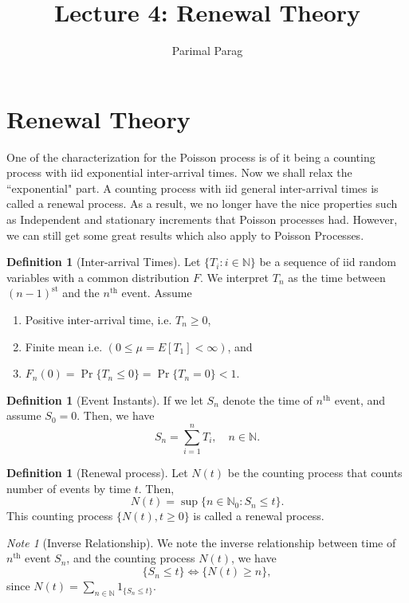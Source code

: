 \documentclass[a4paper,10pt]{article}
\date{}
\title{Lecture 4: Renewal Theory}
\author{Parimal Parag}
\theoremstyle{plain}
\theoremstyle{definition}
\newtheorem{defn}[thm]{Definition}
\theoremstyle{remark}
\newtheorem{note}[thm]{Note}
\begin{document}
\maketitle

\section{Renewal Theory}
One of the characterization for the Poisson process is of it being a counting process with iid exponential inter-arrival times. Now we shall relax the ``exponential" part. A counting process with iid general inter-arrival times is called a renewal process.
As a result, we no longer have the nice properties such as Independent and stationary increments that Poisson processes had. However, we can still get some great results which also apply to Poisson Processes. 

\begin{defn}[Inter-arrival Times]Let $\{T_i: i \in \mathbb{N}\}$ be a sequence of iid random variables with a common distribution $F$. We interpret $T_n$ as the time between $(n - 1)^{\mathrm{st}}$ and the $n^{\mathrm{th}}$ event. Assume 
\begin{enumerate}
  \item Positive inter-arrival time, i.e. $T_n \geq 0$,
	\item Finite mean i.e. $(0 \leq \mu = E[T_1] < \infty)$, and
	\item $F_n(0) = \Pr\{T_n \leq 0\} = \Pr\{T_n = 0\} < 1$.
\end{enumerate}
\end{defn}

\begin{defn}[Event Instants] If we let $S_n$ denote the time of $n^{\mathrm{th}}$ event, and assume $S_0 = 0$. Then, we have
\begin{equation*} 
S_n = \sum_{i=1}^n T_i, \quad n\in \mathbb{N}. 
\end{equation*}
\end{defn}

\begin{defn}[Renewal process] Let $N(t)$ be the counting process that counts number of events by time $t$. Then,
\begin{equation*} 
N(t) = \sup\{n \in \mathbb{N}_0 : S_n \leq t\}.
\end{equation*} 
This counting process $\{N(t), t \geq 0\}$ is called a renewal process.
\end{defn}
\begin{note}[Inverse Relationship]
We note the inverse relationship between time of $n^{\mathrm{th}}$ event $S_n$, and the counting process $N(t)$, we have 
\begin{equation}
\label{eq:InverseRelationship}
\{S_n \leq t\} \iff \{N(t) \geq n\},
\end{equation}
since $N(t) = \sum_{n \in \mathbb{N}}1_{\{S_n \leq t\}}$.
\end{note}
\end{document}
